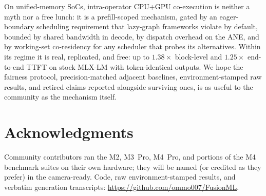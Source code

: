 \documentclass{article}
\newcommand{\x}[1]{$#1\times$}
\begin{document}
On unified-memory SoCs, intra-operator CPU+GPU co-execution is neither a
myth nor a free lunch: it is a prefill-scoped mechanism, gated by an
eager-boundary scheduling requirement that lazy-graph frameworks violate by
default, bounded by shared bandwidth in decode, by dispatch overhead on the
ANE, and by working-set co-residency for any scheduler that probes its
alternatives. Within its regime it is real, replicated, and free: up to
\x{1.38} block-level and \x{1.25} end-to-end TTFT on stock MLX-LM with
token-identical outputs. We hope the fairness protocol, precision-matched
adjacent baselines, environment-stamped raw results, and retired claims
reported alongside surviving ones, is as useful to the community as the
mechanism itself.

\section*{Acknowledgments}
Community contributors ran the M2, M3~Pro, M4~Pro, and portions of the M4
benchmark suites on their own hardware; they will be named (or credited as
they prefer) in the camera-ready. Code, raw environment-stamped results,
and verbatim generation transcripts:
\url{https://github.com/ommo007/FusionML}.



\end{document}
